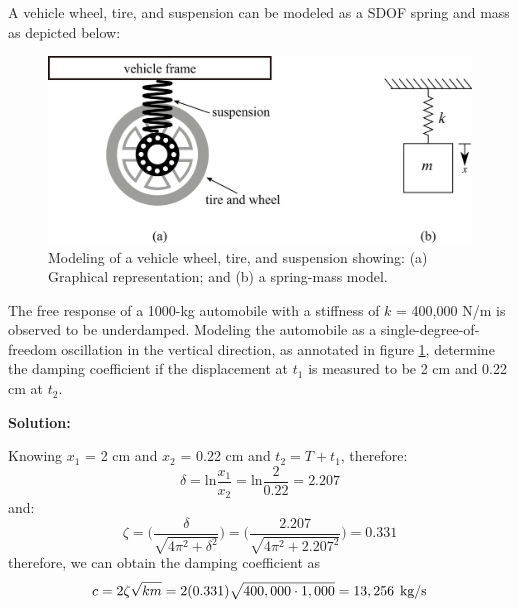 \documentclass[12pt,letter]{article}
\begin{document}
	
\begin{example}

			A vehicle wheel, tire, and suspension can be modeled as a SDOF spring and mass as depicted below: %
			
			\begin{figure}[H]
				\centering
				\includegraphics[width=1\linewidth]{../figures/Vehicle_wheel_undamped.png}
				\caption{Modeling of a vehicle wheel, tire, and suspension showing: (a) Graphical representation; and (b) a spring-mass model.}
				\label{fig:vehicle_wheel_undamped}
			\end{figure}	
			
			The free response of a 1000-kg automobile with a stiffness of $k$ = 400,000 N/m is observed to be underdamped. Modeling the automobile as a single-degree-of-freedom oscillation in the vertical direction, as annotated in figure \ref{fig:vehicle_wheel_undamped}, determine the damping coefficient if the displacement at $t_1$ is measured to be 2 cm and 0.22 cm at $t_2$.

			\noindent\textbf{Solution:} 
						
			Knowing $x_1$ = 2 cm and $x_2$ = 0.22 cm and $t_2 = T + t_1$, therefore:
			\begin{equation}
				\delta = \text{ln}\frac{x_1}{x_2} = \text{ln}\frac{2}{0.22} = 2.207
			\end{equation}			
			and:
			\begin{equation}
				\zeta = \bigg(\frac{\delta}{\sqrt{4\pi^2+\delta^2}}\bigg) = \bigg(\frac{2.207}{\sqrt{4\pi^2+2.207^2}}\bigg) = 0.331
			\end{equation}
			therefore, we can obtain the damping coefficient as
			\begin{equation}
				c = 2\zeta\sqrt{km}=2(0.331)\sqrt{400,000 \cdot 1,000} = 13,256 \hspace{1ex} 
				\text{kg/s} 
			\end{equation}	

\end{example}














	\pagebreak
	\renewcommand{\thepage}{}
	\renewcommand\refname{References Cited}
	\pagestyle{plain}
	
	
\end{document}
